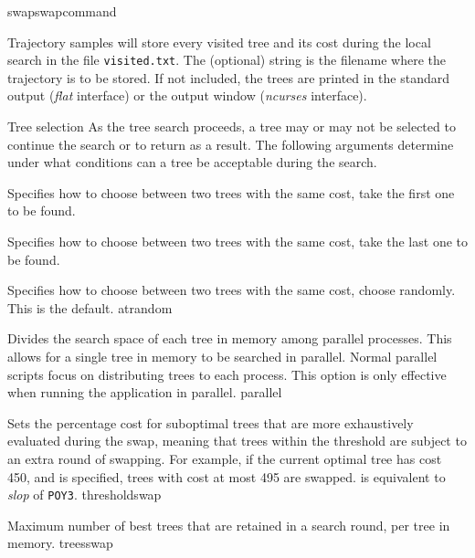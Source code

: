 \begin{command}{swap}{swapcommand}
\begin{arguments}
\begin{argumentgroup}{Trajectory samples}
{ will store every visited tree
and its cost during the local search in the file
\texttt{visited.txt}. The (optional) string is the filename where the
trajectory is to be stored. If not included, the trees are printed
in the standard output (\emph{flat} interface) or the output window (\emph{ncurses}
interface).}
{}

\end{argumentgroup}

\begin{argumentgroup}{Tree selection}
{As the tree search proceeds, a tree may or may not be selected to continue the
search or to return as a result. The following arguments determine under what
conditions can a tree be acceptable during the search.}

{Specifies how to choose between two trees with the same cost, take the first one to be found.}
{}

{Specifies how to choose between two trees with the same cost, take the last one to be found.}
{}

{Specifies how to choose between two trees with the same cost, choose randomly. This is the default.}
{atrandom}

{Divides the search space of each tree in memory among parallel processes. This
allows for a single tree in memory to be searched in parallel. Normal parallel
scripts focus on distributing trees to each process. This option is only
effective when running the application in parallel.}
{parallel}

{Sets the percentage cost for suboptimal trees that are more exhaustively
evaluated during the swap, meaning that trees within the threshold are subject
to an extra round of swapping. For example, if the current optimal tree has
cost 450, and  is specified, trees with cost at most
495 are swapped.  is equivalent to \emph{slop} of \texttt{POY3}.}
{thresholdswap}

{Maximum number of best trees that are retained in a search round,
per tree in memory.}
{treesswap}

\end{argumentgroup}

\end{arguments}


\end{command}
